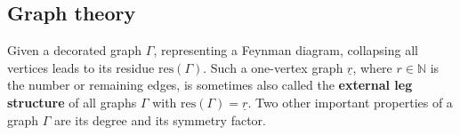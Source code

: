 \subsection{Graph theory}

    Given a decorated graph $\Gamma$, representing a Feynman diagram, collapsing all vertices leads to its residue $\mathrm{res}(\Gamma)$. Such a one-vertex graph $\underline{r}$, where $r\in\mathbb{N}$ is the number or remaining edges, is sometimes also called the \textbf{external leg structure} of all graphs $\Gamma$ with $\mathrm{res}(\Gamma)=\underline{r}$. Two other important properties of a graph $\Gamma$ are its degree and its symmetry factor.


